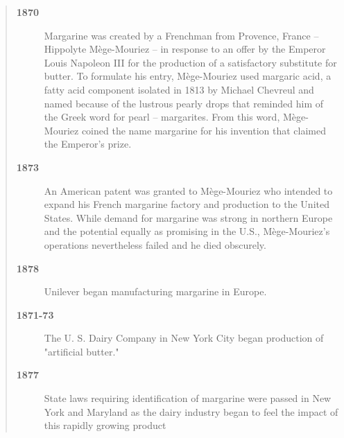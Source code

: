 \documentclass[opre,nonblindrev]{informs3} %
\begin{document}
\begin{quotation}

\begin{description}

\item[\bf 1870] Margarine was created by a Frenchman from Provence,
France -- Hippolyte M\`ege-Mouriez -- in response to an offer by
the Emperor Louis Napoleon III for the production of a satisfactory
substitute for butter. To formulate his entry, M\`ege-Mouriez used
margaric acid, a fatty acid component isolated in 1813 by Michael
Chevreul and named because of the lustrous pearly drops that reminded
him of the Greek word for pearl -- margarites. From this word,
M\`ege-Mouriez coined the name margarine for his invention that
claimed the Emperor's prize.

\item[\bf 1873] An American patent was granted to M\`ege-Mouriez who
intended to expand his French margarine factory and production to
the United States. While demand for margarine was strong in northern
Europe and the potential equally as promising in the U.S.,
M\`ege-Mouriez's operations nevertheless failed and he died obscurely.

\item[\bf 1878] Unilever began manufacturing margarine in Europe.

\item[\bf 1871-73] The U. S. Dairy Company in New York City began
production of "artificial butter."

\item[\bf 1877] State laws requiring identification of margarine were
passed in New York and Maryland as the dairy industry began to feel
the impact of this rapidly growing product


\end{description}
\end{quotation}
\end{document}
